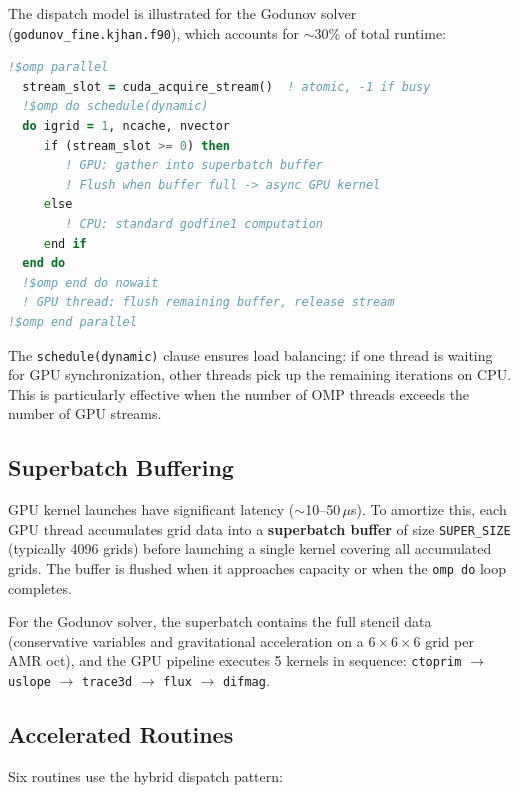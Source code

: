 \documentclass[11pt,fleqn]{book}
\begin{document}
The dispatch model is illustrated for the Godunov solver (\texttt{godunov\_fine.kjhan.f90}), which accounts for $\sim$30\% of total runtime:

\begin{lstlisting}[language=Fortran,basicstyle=\small\ttfamily,frame=single,caption={Dynamic hybrid dispatch pattern},label=lst:hybrid]
!$omp parallel
  stream_slot = cuda_acquire_stream()  ! atomic, -1 if busy
  !$omp do schedule(dynamic)
  do igrid = 1, ncache, nvector
     if (stream_slot >= 0) then
        ! GPU: gather into superbatch buffer
        ! Flush when buffer full -> async GPU kernel
     else
        ! CPU: standard godfine1 computation
     end if
  end do
  !$omp end do nowait
  ! GPU thread: flush remaining buffer, release stream
!$omp end parallel
\end{lstlisting}

The \texttt{schedule(dynamic)} clause ensures load balancing: if one thread is waiting for GPU synchronization, other threads pick up the remaining iterations on CPU.  This is particularly effective when the number of OMP threads exceeds the number of GPU streams.

\subsection{Superbatch Buffering}

GPU kernel launches have significant latency ($\sim$10--50\,$\mu$s).  To amortize this, each GPU thread accumulates grid data into a \textbf{superbatch buffer} of size \texttt{SUPER\_SIZE} (typically 4096 grids) before launching a single kernel covering all accumulated grids.  The buffer is flushed when it approaches capacity or when the \texttt{omp do} loop completes.

For the Godunov solver, the superbatch contains the full stencil data (conservative variables and gravitational acceleration on a $6 \times 6 \times 6$ grid per AMR oct), and the GPU pipeline executes 5 kernels in sequence: \texttt{ctoprim} $\to$ \texttt{uslope} $\to$ \texttt{trace3d} $\to$ \texttt{flux} $\to$ \texttt{difmag}.

\subsection{Accelerated Routines}

Six routines use the hybrid dispatch pattern:
\end{document}
